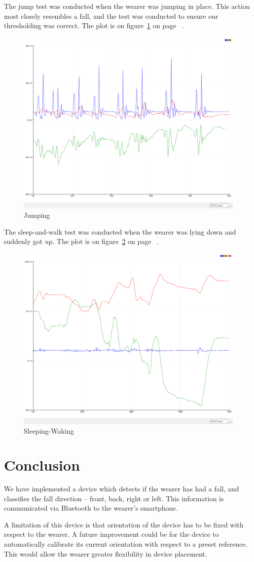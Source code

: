 \documentclass[11pt, a4paper]{article}
\begin{document}
\noindent The jump test was conducted when the wearer was jumping in place. This
action most closely resembles a fall, and the test was conducted to ensure our
thresholding was correct. The plot is on figure~\ref{fig:jumping} on page
~\pageref{fig:jumping}.
\begin{figure}
    \centering
    \includegraphics[width=0.70\linewidth]{jump.png}
    \caption{Jumping}
    \label{fig:jumping}
\end{figure}

\noindent The sleep-and-walk test was conducted when the wearer was lying down and suddenly
got up. The plot is on figure~\ref{fig:sleeping} on page ~\pageref{fig:sleeping}.
\begin{figure}
    \centering
    \includegraphics[width=0.7\linewidth]{sleep.png}
    \caption{Sleeping-Waking}
    \label{fig:sleeping}
\end{figure}

\section{Conclusion}
We have implemented a device which detects if the wearer has had a fall, and
classifies the fall direction -- front, back, right or left. This information
is communicated via Bluetooth to the wearer's smartphone.

\noindent A limitation of this device is that orientation of the device has
to be fixed with respect to the wearer.  A future improvement could be for the
device to automatically calibrate its current orientation with respect to a
preset reference. This would allow the wearer greater flexibility in device
placement.



\end{document}
